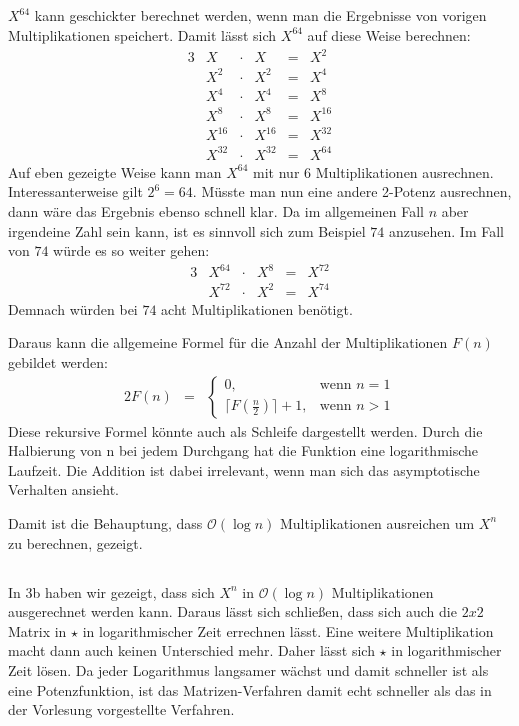 \documentclass[10pt,a4paper,oneside,ngerman,numbers=noenddot]{scrartcl}
\begin{document}
	\subsection{} %
	$X^{64}$ kann geschickter berechnet werden, wenn man die Ergebnisse von vorigen Multiplikationen speichert. Damit lässt sich $X^{64}$ auf diese Weise berechnen:\\
	\begin{alignat*}{3}
	& X &\cdot & X &=& X^{2} \\
	& X^{2} &\cdot & X^{2} &=& X^{4} \\
	& X^{4} &\cdot & X^{4} &=& X^{8} \\
	& X^{8} &\cdot & X^{8} &=& X^{16} \\
	& X^{16} &\cdot & X^{16} &=& X^{32} \\
	& X^{32} &\cdot & X^{32} &=& X^{64}
	\end{alignat*}
	Auf eben gezeigte Weise kann man $X^{64}$ mit nur $6$ Multiplikationen ausrechnen. Interessanterweise gilt $2^{6} = 64$. Müsste man nun eine andere 2-Potenz ausrechnen, dann wäre das Ergebnis ebenso schnell klar. Da im allgemeinen Fall $n$ aber irgendeine Zahl sein kann, ist es sinnvoll sich zum Beispiel $74$ anzusehen. Im Fall von $74$ würde es so weiter gehen:
	\begin{alignat*}{3}
	& X^{64} &\cdot & X^{8} &=& X^{72} \\
	& X^{72} &\cdot & X^{2} &=& X^{74}
	\end{alignat*}
	Demnach würden bei $74$ acht Multiplikationen benötigt.
	
	Daraus kann die allgemeine Formel für die Anzahl der Multiplikationen $F(n)$ gebildet werden:\\
	\begin{alignat*}{2}
	F(n) &=& \begin{cases}
  0,  & \text{wenn } n = 1\\
  \lceil F(\frac{n}{2}) \rceil + 1, & \text{wenn } n > 1
		\end{cases}
	\end{alignat*}
	Diese rekursive Formel könnte auch als Schleife dargestellt werden. Durch die Halbierung von n bei jedem Durchgang hat die Funktion eine logarithmische Laufzeit. Die Addition ist dabei irrelevant, wenn man sich das asymptotische Verhalten ansieht.
	
	Damit ist die Behauptung, dass $\mathcal{O}(\log n)$ Multiplikationen ausreichen um $X^{n}$ zu berechnen, gezeigt.
	\subsection{} %
	
	In 3b haben wir gezeigt, dass sich $X^{n}$ in $\mathcal{O}(\log n)$ Multiplikationen ausgerechnet werden kann. Daraus lässt sich schließen, dass sich auch die $2x2$ Matrix in $\star$ in logarithmischer Zeit errechnen lässt. Eine weitere Multiplikation macht dann auch keinen Unterschied mehr. Daher lässt sich $\star$ in logarithmischer Zeit lösen. Da jeder Logarithmus langsamer wächst und damit schneller ist als eine Potenzfunktion, ist das Matrizen-Verfahren damit echt schneller als das in der Vorlesung vorgestellte Verfahren.
\end{document}
